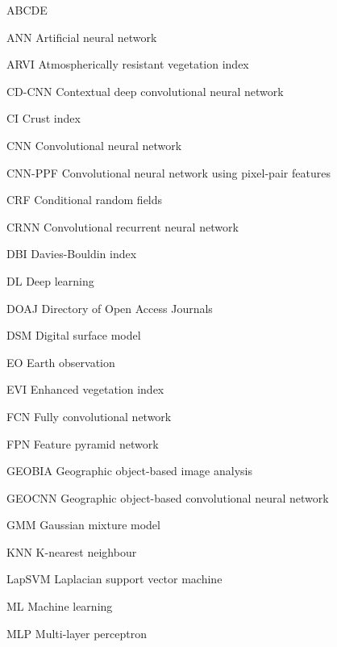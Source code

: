 
\begin{seznamzkratek}{ABCDE}

	      {ANN}
	      {Artificial neural network}

	      {ARVI}
	      {Atmospherically resistant vegetation index}

	      {CD-CNN}
	      {Contextual deep convolutional neural network}

	      {CI}
	      {Crust index}

	      {CNN}
	      {Convolutional neural network}

	      {CNN-PPF}
	      {Convolutional neural network using pixel-pair features}

	      {CRF}
	      {Conditional random fields}

	      {CRNN}
	      {Convolutional recurrent neural network}

	      {DBI}
	      {Davies-Bouldin index}

	      {DL}
	      {Deep learning}

	      {DOAJ}
	      {Directory of Open Access Journals}

	      {DSM}
	      {Digital surface model}

	      {EO}
	      {Earth observation}

	      {EVI}
	      {Enhanced vegetation index}

	      {FCN}
	      {Fully convolutional network}

	      {FPN}
	      {Feature pyramid network}

	      {GEOBIA}
	      {Geographic object-based image analysis}

	      {GEOCNN}
	      {Geographic object-based convolutional neural network}

	      {GMM}
	      {Gaussian mixture model}

	      {KNN}
	      {K-nearest neighbour}

	      {LapSVM}
	      {Laplacian support vector machine}

	      {ML}
	      {Machine learning}

	      {MLP}
	      {Multi-layer perceptron}


\end{seznamzkratek}
